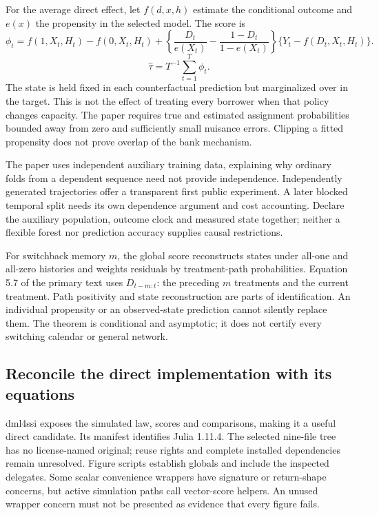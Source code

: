 For the average direct effect, let $f(d,x,h)$ estimate the conditional outcome
and $e(x)$ the propensity in the selected model. The score is
\[
 \phi_t=f(1,X_t,H_t)-f(0,X_t,H_t)
 +\left\{\frac{D_t}{e(X_t)}-\frac{1-D_t}{1-e(X_t)}\right\}
   \{Y_t-f(D_t,X_t,H_t)\}.
\]
\[
 \widehat\tau=T^{-1}\sum_{t=1}^T\phi_t.
\]
The state is held fixed in each counterfactual prediction but marginalized
over in the target. This is not the effect of treating every borrower when
that policy changes capacity. The paper requires true and estimated assignment
probabilities bounded away from zero and sufficiently small nuisance errors.
Clipping a fitted propensity does not prove overlap of the bank mechanism.
\citep{exec25_onet_paper}

The paper uses independent auxiliary training data, explaining why ordinary
folds from a dependent sequence need not provide independence. Independently
generated trajectories offer a transparent first public experiment. A later
blocked temporal split needs its own dependence argument and cost accounting.
Declare the auxiliary population, outcome clock and measured state together;
neither a flexible forest nor prediction accuracy supplies causal restrictions.
\citep{exec25_onet_paper,exec25_onet_choice}

For switchback memory $m$, the global score reconstructs states under all-one
and all-zero histories and weights residuals by treatment-path probabilities.
Equation 5.7 of the primary text uses $D_{t-m:t}$: the preceding $m$ treatments
and the current treatment. Path positivity and state reconstruction are parts
of identification. An individual propensity or an observed-state prediction
cannot silently replace them. The theorem is conditional and asymptotic; it
does not certify every switching calendar or general network.
\citep{exec25_onet_paper}

\subsection{Reconcile the direct implementation with its equations}

dml4ssi exposes the simulated law, scores and comparisons, making it a useful
direct candidate. Its manifest identifies Julia 1.11.4. The selected nine-file
tree has no license-named original; reuse rights and complete installed
dependencies remain unresolved. Figure scripts establish globals and include
the inspected delegates. Some scalar convenience wrappers have signature or
return-shape concerns, but active simulation paths call vector-score helpers.
An unused wrapper concern must not be presented as evidence that every figure
fails.~\citep{exec25_onet_dml}

